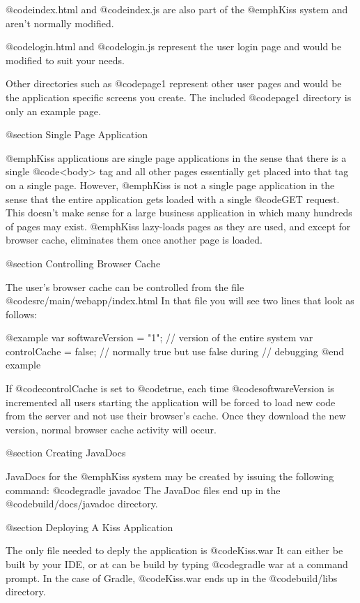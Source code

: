 @code{index.html} and @code{index.js} are also part of the @emph{Kiss} system and aren't normally modified.

@code{login.html} and @code{login.js} represent the user login page and would be modified to suit your needs.

Other directories such as @code{page1} represent other user pages and would be the application specific screens you create.  The included @code{page1} directory is only an example page.


@section Single Page Application

@emph{Kiss} applications are single page applications in the sense
that there is a single @code{<body>} tag and all other pages
essentially get placed into that tag on a single page.  However,
@emph{Kiss} is not a single page application in the sense that the
entire application gets loaded with a single @code{GET} request.  This
doesn't make sense for a large business application in which many
hundreds of pages may exist.  @emph{Kiss} lazy-loads pages as they are
used, and except for browser cache, eliminates them once another page
is loaded.

@section Controlling Browser Cache

The user's browser cache can be controlled from the file @code{src/main/webapp/index.html}  In that file you will see two lines that look as follows:

@example
var softwareVersion = "1";  // version of the entire system
var controlCache = false;   // normally true but use false during 
                            // debugging
@end example

If @code{controlCache} is set to @code{true}, each time @code{softwareVersion}
is incremented all users starting the application will be forced to
load new code from the server and not use their browser's cache.  Once
they download the new version, normal browser cache activity will
occur.


@section Creating JavaDocs

JavaDocs for the @emph{Kiss} system may be created by issuing the following command:  @code{gradle javadoc} The JavaDoc files end up in the @code{build/docs/javadoc} directory.


@section Deploying A Kiss Application

The only file needed to deply the application is @code{Kiss.war} It
can either be built by your IDE, or at can be build by typing
@code{gradle war} at a command prompt.  In the case of Gradle,
@code{Kiss.war} ends up in the @code{build/libs} directory.

